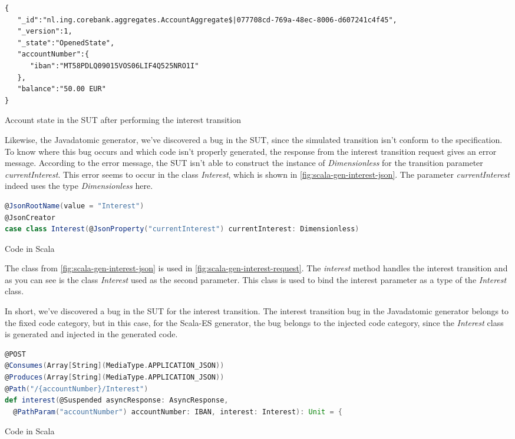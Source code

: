 \begin{sourcecode}[h!]
\begin{lstlisting}[]
{
   "_id":"nl.ing.corebank.aggregates.AccountAggregate$|077708cd-769a-48ec-8006-d607241c4f45",
   "_version":1,
   "_state":"OpenedState",
   "accountNumber":{
      "iban":"MT58PDLQ09015VOS06LIF4Q525NRO1I"
   },
   "balance":"50.00 EUR"
}
\end{lstlisting}
\caption{Account state in the SUT after performing the interest transition}
\label{fig:interest-opened-account-scalaes-json}
\end{sourcecode}

Likewise, the Javadatomic generator, we've discovered a bug in the SUT, since
the simulated transition isn't conform to the specification. To know where this
bug occurs and which code isn't properly generated, the response from the
interest transition request gives an error message. According to the error
message, the SUT isn't able to construct the instance of \textit{Dimensionless}
for the transition parameter \textit{currentInterest}. This error seems to occur
in the class \textit{Interest}, which is shown in
\autoref{fig:scala-gen-interest-json}. The parameter \textit{currentInterest}
indeed uses the type \textit{Dimensionless} here.

\begin{sourcecode}[h!]
\begin{lstlisting}[language=scala]
@JsonRootName(value = "Interest")
@JsonCreator
case class Interest(@JsonProperty("currentInterest") currentInterest: Dimensionless)
\end{lstlisting}
\caption{Code in Scala}
\label{fig:scala-gen-interest-json}
\end{sourcecode}

The class from \autoref{fig:scala-gen-interest-json} is used in
\autoref{fig:scala-gen-interest-request}. The \textit{interest} method handles
the interest transition and as you can see is the class \textit{Interest} used
as the second parameter. This class is used to bind the interest parameter as a
type of the \textit{Interest} class.

In short, we've discovered a bug in the SUT
for the interest transition. The interest transition bug in the Javadatomic
generator belongs to the fixed code category, but in this case, for the Scala-ES
generator, the bug belongs to the injected code category, since the
\textit{Interest} class is generated and injected in the generated code.

\begin{sourcecode}[h!]
\begin{lstlisting}[language=scala]
@POST
@Consumes(Array[String](MediaType.APPLICATION_JSON))
@Produces(Array[String](MediaType.APPLICATION_JSON))
@Path("/{accountNumber}/Interest")
def interest(@Suspended asyncResponse: AsyncResponse,
  @PathParam("accountNumber") accountNumber: IBAN, interest: Interest): Unit = {
\end{lstlisting}
\caption{Code in Scala}
\label{fig:scala-gen-interest-request}
\end{sourcecode}

